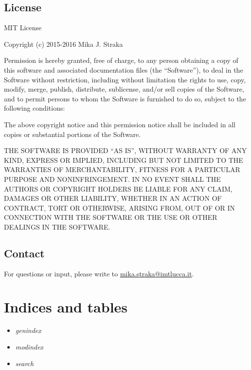 \documentclass[letterpaper,10pt,english]{sphinxmanual}
\begin{document}
\section{License}
\label{source/license::doc}\label{source/license:license}\label{source/license:id1}
MIT License

Copyright (c) 2015-2016 Mika J. Straka

Permission is hereby granted, free of charge, to any person obtaining a copy
of this software and associated documentation files (the ``Software''), to deal
in the Software without restriction, including without limitation the rights
to use, copy, modify, merge, publish, distribute, sublicense, and/or sell
copies of the Software, and to permit persons to whom the Software is
furnished to do so, subject to the following conditions:

The above copyright notice and this permission notice shall be included in all
copies or substantial portions of the Software.

THE SOFTWARE IS PROVIDED ``AS IS'', WITHOUT WARRANTY OF ANY KIND, EXPRESS OR
IMPLIED, INCLUDING BUT NOT LIMITED TO THE WARRANTIES OF MERCHANTABILITY,
FITNESS FOR A PARTICULAR PURPOSE AND NONINFRINGEMENT. IN NO EVENT SHALL THE
AUTHORS OR COPYRIGHT HOLDERS BE LIABLE FOR ANY CLAIM, DAMAGES OR OTHER
LIABILITY, WHETHER IN AN ACTION OF CONTRACT, TORT OR OTHERWISE, ARISING FROM,
OUT OF OR IN CONNECTION WITH THE SOFTWARE OR THE USE OR OTHER DEALINGS IN THE
SOFTWARE.


\section{Contact}
\label{source/contact:contact}\label{source/contact::doc}
For questions or input, please write to \href{mailto:mika.straka@imtlucca.it}{mika.straka@imtlucca.it}.


\chapter{Indices and tables}
\label{index:indices-and-tables}\begin{itemize}
\item {} 
\emph{genindex}

\item {} 
\emph{modindex}

\item {} 
\emph{search}

\end{itemize}
\end{document}
